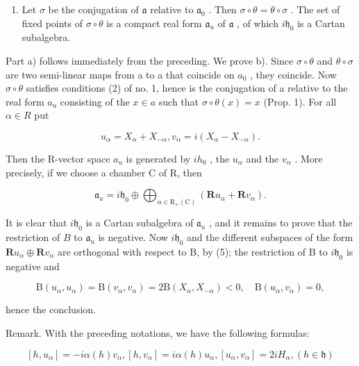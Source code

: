 \begin{enumerate}
\def\labelenumi{\alph{enumi})}
\setcounter{enumi}{1}
\tightlist
\item
  Let \(\sigma\) be the conjugation of \(\mathfrak{a}\) relative to \(\mathfrak{a}_0\) . Then \(\sigma \circ \theta = \theta \circ \sigma\) . The set of fixed points of \(\sigma \circ \theta\) is a compact real form \(\mathfrak{a}_u\) of \(\mathfrak{a}\) , of which \(i\mathfrak{h}_0\) is a Cartan subalgebra.
\end{enumerate}

Part a) follows immediately from the preceding. We prove b). Since \(\sigma\circ\theta\) and \(\theta\circ\sigma\) are two semi-linear maps from a to a that coincide on \(a_{0}\) , they coincide. Now \(\sigma\circ\theta\) satisfies conditions (2) of no. 1, hence is the conjugation of a relative to the real form \(a_{u}\) consisting of the \(x\in a\) such that \(\sigma\circ\theta(x)=x\) (Prop. 1). For all \(\alpha\in R\) put

\[
u _ {\alpha} = X _ {\alpha} + X _ {- \alpha}, v _ {\alpha} = i (X _ {\alpha} - X _ {- \alpha}).\tag{6}
\]

Then the R-vector space \(a_{u}\) is generated by \(ih_{0}\) , the \(u_{\alpha}\) and the \(v_{\alpha}\) . More precisely, if we choose a chamber C of R, then

\[
\mathfrak {a} _ {u} = i \mathfrak {h} _ {0} \oplus \bigoplus_ {\alpha \in \mathrm{R} _ {+} (\mathrm{C})} \left(\mathbf {R} u _ {\alpha} + \mathbf {R} v _ {\alpha}\right).\tag{7}
\]

It is clear that \(i\mathfrak{h}_0\) is a Cartan subalgebra of \(\mathfrak{a}_u\) , and it remains to prove that the restriction of \(B\) to \(\mathfrak{a}_u\) is negative. Now \(i\mathfrak{h}_0\) and the different subspaces of the form \(\mathbf{R}u_{\alpha}\oplus \mathbf{R}v_{\alpha}\) are orthogonal with respect to B, by (5); the restriction of B to \(i\mathfrak{h}_0\) is negative and

\[
\mathrm{B} (u _ {\alpha}, u _ {\alpha}) = \mathrm{B} (v _ {\alpha}, v _ {\alpha}) = 2 \mathrm{B} (X _ {\alpha}, X _ {- \alpha}) <   0, \quad \mathrm{B} (u _ {\alpha}, v _ {\alpha}) = 0,\tag{8}
\]

hence the conclusion.

Remark. With the preceding notations, we have the following formulas:

\[
[ h, u _ {\alpha} ] = - i \alpha (h) v _ {\alpha}, [ h, v _ {\alpha} ] = i \alpha (h) u _ {\alpha}, [ u _ {\alpha}, v _ {\alpha} ] = 2 i H _ {\alpha}, (h \in \mathfrak {h})\tag{9}
\]

